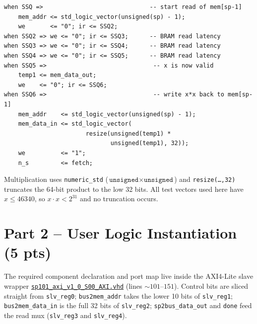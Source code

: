 \documentclass[11pt,letterpaper]{article}
\begin{document}
\begin{lstlisting}[style=vhdlstyle,caption={Core micro-states (excerpt
of \texttt{when SSQ ...} body in
\href{run:../stackprocessor_101/rtl/user_logic.vhd}{\texttt{user\_logic.vhd}}).},label={lst:ssq}]
when SSQ =>                              -- start read of mem[sp-1]
    mem_addr <= std_logic_vector(unsigned(sp) - 1);
    we       <= "0"; ir <= SSQ2;
when SSQ2 => we <= "0"; ir <= SSQ3;      -- BRAM read latency
when SSQ3 => we <= "0"; ir <= SSQ4;      -- BRAM read latency
when SSQ4 => we <= "0"; ir <= SSQ5;      -- BRAM read latency
when SSQ5 =>                              -- x is now valid
    temp1 <= mem_data_out;
    we    <= "0"; ir <= SSQ6;
when SSQ6 =>                              -- write x*x back to mem[sp-1]
    mem_addr    <= std_logic_vector(unsigned(sp) - 1);
    mem_data_in <= std_logic_vector(
                       resize(unsigned(temp1) *
                              unsigned(temp1), 32));
    we          <= "1";
    n_s         <= fetch;
\end{lstlisting}

Multiplication uses \texttt{numeric\_std} (\(\texttt{unsigned}\times
\texttt{unsigned}\)) and \texttt{resize(\dots,32)} truncates the
64-bit product to the low 32 bits.  All test vectors used here have
\(x\le 46340\), so \(x\cdot x<2^{31}\) and no truncation occurs.

\section{Part 2 -- User Logic Instantiation (5 pts)}

\begin{sloppypar}
The required component declaration and port map live inside the
AXI4-Lite slave wrapper
\href{run:../stackprocessor_101/rtl/sp101_axi_v1_0_S00_AXI.vhd}%
{\texttt{sp101\_axi\_v1\_0\_S00\_AXI.vhd}}
(lines \(\sim 101\)--\(151\)).
Control bits are sliced straight from \texttt{slv\_reg0};
\texttt{bus2mem\_addr} takes the lower 10 bits of \texttt{slv\_reg1};
\texttt{bus2mem\_data\_in} is the full 32 bits of \texttt{slv\_reg2};
\texttt{sp2bus\_data\_out} and \texttt{done} feed the read mux
(\texttt{slv\_reg3} and \texttt{slv\_reg4}).
\end{sloppypar}
\end{document}
